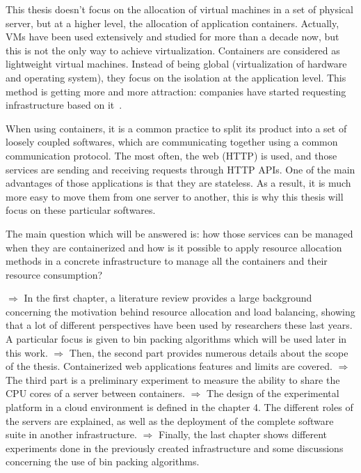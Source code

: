 This thesis doesn't focus on the allocation of virtual machines in a set of
physical server, but at a higher level, the allocation of application
containers. Actually, VMs have been used extensively and studied for more than
a decade now, but this is not the only way to achieve virtualization.
Containers are considered as lightweight virtual machines. Instead of being
global (virtualization of hardware and operating system), they focus on the
isolation at the application level. This method is getting more and more
attraction: companies have started requesting infrastructure based on
it~\cite{dockerOverVMWare}.

When using containers, it is a common practice to split its product into
a set of loosely coupled softwares, which are communicating together using
a common communication protocol. The most often, the web (HTTP) is used, and those
services are sending and receiving requests through HTTP APIs\@. One of the main
advantages of those applications is that they are stateless. As a result, it is
much more easy to move them from one server to another, this is why this thesis
will focus on these particular softwares.

The main question which will be answered is: how those services can be managed
when they are containerized and how is it possible to apply resource allocation
methods in a concrete infrastructure to manage all the containers and their
resource consumption?

$\Rightarrow$ In the first chapter, a literature review provides a large
background concerning the motivation behind resource allocation and load
balancing, showing that a lot of different perspectives have been used by
researchers these last years. A particular focus is given to bin packing
algorithms which will be used later in this work. \vspace{5pt} \newline
$\Rightarrow$ Then, the second part provides numerous details about the scope of
the thesis. Containerized web applications features and limits are covered.
\vspace{5pt} \newline $\Rightarrow$ The third part is a preliminary experiment
to measure the ability to share the CPU cores of a server between containers.
\vspace{5pt} \newline $\Rightarrow$ The design of the experimental platform in
a cloud environment is defined in the chapter 4. The different roles of the
servers are explained, as well as the deployment of the complete software suite
in another infrastructure.\vspace{5pt} \newline $\Rightarrow$ Finally, the
last chapter shows different experiments done in the previously created
infrastructure and some discussions concerning the use of bin packing
algorithms.

 
